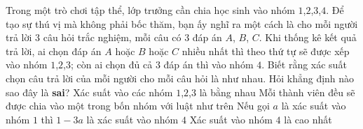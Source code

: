 \documentclass[12pt,a4paper,oneside]{book}
\begin{document}
\begin{ex}%
	Trong một trò chơi tập thể, lớp trưởng cần chia học sinh vào nhóm $ 1 $,$ 2 $,$ 3 $,$ 4 $. Để tạo sự thú vị mà không phải bốc thăm, bạn ấy nghĩ ra một cách là cho mỗi người trả lời $ 3 $ câu
	hỏi trắc nghiệm, mỗi câu có $ 3 $ đáp án $ A $, $ B $, $ C $. Khi thống kê kết quả trả lời, ai chọn đáp án $ A $ hoặc $ B $ hoặc $ C $ nhiều nhất thì theo thứ tự sẽ được xếp vào nhóm $ 1 $,$ 2 $,$ 3 $; còn ai chọn đủ cả $ 3 $ đáp án thì vào nhóm $ 4 $. Biết rằng xác suất chọn câu trả lời của mỗi người cho mỗi câu hỏi là như nhau. Hỏi khẳng định nào sao đây là \textbf{sai}?
	\choice
	{Xác suất vào các nhóm $ 1 $,$ 2 $,$ 3 $ là bằng nhau}
	{Mỗi thành viên đều sẽ được chia vào một trong bốn nhóm với luật như trên}
	{Nếu gọi $ a $ là xác suất vào nhóm $ 1 $ thì $ 1-3a $ là xác suất vào nhóm $ 4 $}
	{\True Xác suất vào nhóm $ 4 $ là cao nhất}
\end{ex}
\end{document}
